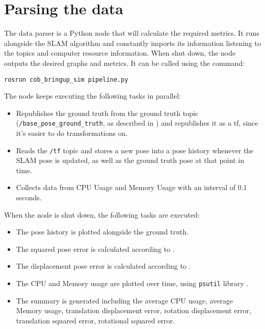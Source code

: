 \section{Parsing the data}

The data parser is a Python node that will calculate the required metrics. It runs alongside the SLAM algorithm and constantly imports its information listening to the topics and computer resource information. When shut down, the node outputs the desired graphs and metrics. It can be called using the command:

\begin{verbatim}
rosrun cob_bringup_sim pipeline.py
\end{verbatim}

The node keeps executing the following tasks in parallel:

\begin{itemize}
    \item Republishes the ground truth from the ground truth topic (\texttt{/base\_pose\_ground\_truth}, as described in ) and republishes it as a tf, since it's easier to do transformations on. 
    \item Reads the \texttt{/tf} topic and stores a new pose into a pose history whenever the SLAM pose is updated, as well as the ground truth pose at that point in time.
    \item Collects data from CPU Usage and Memory Usage with an interval of 0.1 seconds.
\end{itemize}

When the node is shut down, the following tasks are executed:

\begin{itemize}
    \item The pose history is plotted alongside the ground truth.
    \item The squared pose error is calculated according to .
    \item The displacement pose error is calculated according to .
    \item The CPU and Memory usage are plotted over time, using \texttt{psutil} library \cite{psutil}.
    \item The summary is generated including the average CPU usage, average Memory usage, translation displacement error, rotation displacement error, translation squared error, rotational squared error.
\end{itemize}


